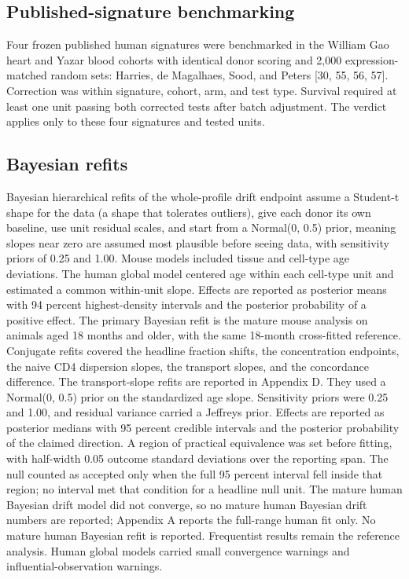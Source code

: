 \documentclass[11pt]{article}
\begin{document}
\subsection*{Published-signature benchmarking}

Four frozen published human signatures were benchmarked in the William Gao heart and Yazar blood cohorts with identical donor scoring and 2,000 expression-matched random sets: Harries, de Magalhaes, Sood, and Peters [30, 55, 56, 57]. Correction was within signature, cohort, arm, and test type. Survival required at least one unit passing both corrected tests after batch adjustment. The verdict applies only to these four signatures and tested units.

\subsection*{Bayesian refits}

Bayesian hierarchical refits of the whole-profile drift endpoint assume a Student-t shape for the data (a shape that tolerates outliers), give each donor its own baseline, use unit residual scales, and start from a Normal(0, 0.5) prior, meaning slopes near zero are assumed most plausible before seeing data, with sensitivity priors of 0.25 and 1.00. Mouse models included tissue and cell-type age deviations. The human global model centered age within each cell-type unit and estimated a common within-unit slope. Effects are reported as posterior means with 94 percent highest-density intervals and the posterior probability of a positive effect. The primary Bayesian refit is the mature mouse analysis on animals aged 18 months and older, with the same 18-month cross-fitted reference. Conjugate refits covered the headline fraction shifts, the concentration endpoints, the naive CD4 dispersion slopes, the transport slopes, and the concordance difference. The transport-slope refits are reported in Appendix D. They used a Normal(0, 0.5) prior on the standardized age slope. Sensitivity priors were 0.25 and 1.00, and residual variance carried a Jeffreys prior. Effects are reported as posterior medians with 95 percent credible intervals and the posterior probability of the claimed direction. A region of practical equivalence was set before fitting, with half-width 0.05 outcome standard deviations over the reporting span. The null counted as accepted only when the full 95 percent interval fell inside that region; no interval met that condition for a headline null unit. The mature human Bayesian drift model did not converge, so no mature human Bayesian drift numbers are reported; Appendix A reports the full-range human fit only. No mature human Bayesian refit is reported. Frequentist results remain the reference analysis. Human global models carried small convergence warnings and influential-observation warnings.
\end{document}
